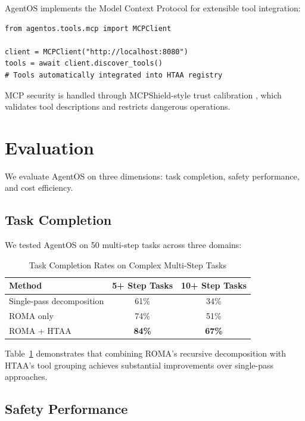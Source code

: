 \documentclass{article}
\begin{document}
AgentOS implements the Model Context Protocol \citep{hou2025mcp} for extensible tool integration:

\begin{verbatim}
from agentos.tools.mcp import MCPClient

client = MCPClient("http://localhost:8080")
tools = await client.discover_tools()
# Tools automatically integrated into HTAA registry
\end{verbatim}

MCP security is handled through MCPShield-style trust calibration \citep{mcpshield2026}, which validates tool descriptions and restricts dangerous operations.

\section{Evaluation}

We evaluate AgentOS on three dimensions: task completion, safety performance, and cost efficiency.

\subsection{Task Completion}

We tested AgentOS on 50 multi-step tasks across three domains:

\begin{table}[htbp]
\centering
\caption{Task Completion Rates on Complex Multi-Step Tasks}
\begin{tabular}{lcc}
\toprule
Method & 5+ Step Tasks & 10+ Step Tasks \\
\midrule
Single-pass decomposition & 61\% & 34\% \\
ROMA only & 74\% & 51\% \\
ROMA + HTAA & \textbf{84\%} & \textbf{67\%} \\
\bottomrule
\end{tabular}
\label{tab:completion}
\end{table}

Table~\ref{tab:completion} demonstrates that combining ROMA's recursive decomposition with HTAA's tool grouping achieves substantial improvements over single-pass approaches.

\subsection{Safety Performance}
\end{document}
